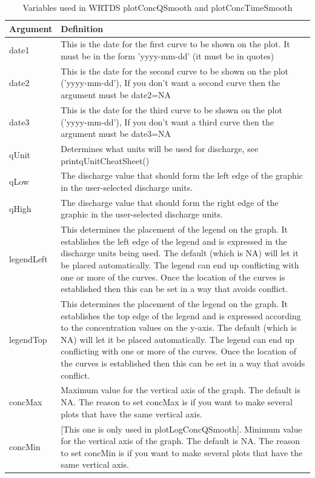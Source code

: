 \documentclass[a4paper,11pt]{article}\usepackage{graphicx, color}
\begin{document}
\begin{table}[ht]
\caption{Variables used in WRTDS plotConcQSmooth and plotConcTimeSmooth \label{tab:wrtdsMultiVariables}}
\begin{tabularx}{\textwidth}{lX}
\hline
  \textbf{Argument} & \textbf{Definition} \\
\hline
date1 & This is the date for the first curve to be shown on the plot.  It must be in the form 'yyyy-mm-dd' (it must be in quotes)\\
date2 & This is the date for the second curve to be shown on the plot ('yyyy-mm-dd'), If you don't want a second curve then the argument must be date2=NA\\
date3 & This is the date for the third curve to be shown on the plot ('yyyy-mm-dd'), If you don't want a third curve then the argument must be date3=NA\\
qUnit & Determines what units will be used for discharge, see printqUnitCheatSheet() \\
qLow & The discharge value that should form the left edge of the graphic in the user-selected discharge units. \\
qHigh & The discharge value that should form the right edge of the graphic in the user-selected discharge units. \\
legendLeft & This determines the placement of the legend on the graph.  It establishes the left edge of the legend and is expressed in the discharge units being used.  The default (which is NA) will let it be placed automatically.  The legend can end up conflicting with one or more of the curves.  Once the location of the curves is established then this can be set in a way that avoids conflict.\\
legendTop & This determines the placement of the legend on the graph.  It establishes the top edge of the legend and is expressed according to the concentration values on the y-axis.  The default (which is NA) will let it be placed automatically.  The legend can end up conflicting with one or more of the curves.  Once the location of the curves is established then this can be set in a way that avoids conflict.\\
concMax & Maximum value for the vertical axis of the graph.  The default is NA.  The reason to set concMax is if you want to make several plots that have the same vertical axis.\\
concMin & [This one is only used in plotLogConcQSmooth].  Minimum value for the vertical axis of the graph.  The default is NA.  The reason to set concMin is if you want to make several plots that have the same vertical axis.\\

\end{tabularx}
\end{table}
\end{document}

